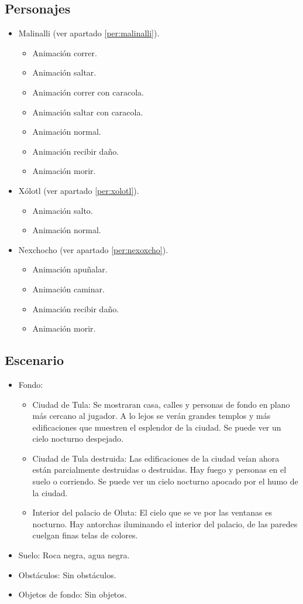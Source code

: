 	\subsection{Personajes}
	\begin{itemize}
		\item Malinalli (ver apartado \ref{per:malinalli}).
		\begin{itemize}
			\item Animación correr.
			\item Animación saltar.
			\item Animación correr con caracola.
			\item Animación saltar con caracola.
			\item Animación normal.
			\item Animación recibir daño.
			\item Animación morir.
		\end{itemize}
		\item Xólotl (ver apartado \ref{per:xolotl}).
		\begin{itemize}
				\item Animación salto.
				\item Animación normal.
		\end{itemize}
		\item Nexchocho (ver apartado \ref{per:nexoxcho}).
		\begin{itemize}
			\item Animación apuñalar.
			\item Animación caminar.
			\item Animación recibir daño.
			\item Animación morir.
		\end{itemize}
	\end{itemize}
	\subsection{Escenario}
\begin{itemize} 
	\item Fondo: 
		\begin{itemize}
			\item Ciudad de Tula: Se mostraran casa, calles y personas de fondo en plano más cercano al jugador. A lo lejos se verán grandes templos y más edificaciones que muestren el esplendor de la ciudad. Se puede ver un cielo nocturno despejado.
			\item Ciudad de Tula destruida: Las edificaciones de la ciudad veían ahora están parcialmente destruidas o destruidas. Hay fuego y personas en el suelo o corriendo. Se puede ver un cielo nocturno apocado por el humo de la ciudad.
			\item Interior del palacio de Oluta: El cielo que se ve por las ventanas es nocturno. Hay antorchas iluminando el interior del palacio, de las paredes cuelgan finas telas de colores.
		\end{itemize}
	\item Suelo: Roca negra, agua negra.
	\item Obstáculos: Sin obstáculos.
	\item Objetos de fondo: Sin objetos.
\end{itemize}	
